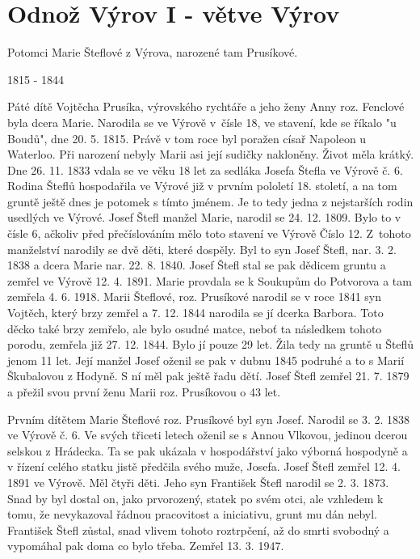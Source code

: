 \documentclass[../dejiny-rodu-prusiku.tex]{subfiles}
\begin{document}
\section{Odnož Výrov I - větve Výrov}

Potomci Marie Šteflové z Výrova, narozené tam Prusíkové.

1815 - 1844

Páté dítě Vojtěcha Prusíka, výrovského rychtáře a jeho ženy Anny roz. Fenclové byla dcera Marie. Narodila se ve Výrově v čísle 18, ve stavení, kde se říkalo "u Boudů", dne 20. 5. 1815. Právě v tom roce byl poražen císař Napoleon u Waterloo. Při narození nebyly Marii asi její sudičky nakloněny. Život měla krátký. Dne 26. 11. 1833 vdala se ve věku 18 let za sedláka Josefa Štefla ve Výrově č. 6. Rodina Šteflů hospodařila ve Výrové již v prvním pololetí 18. století, a na tom gruntě ještě dnes je potomek s tímto jménem. Je to tedy jedna z nejstarších rodin usedlých ve Výrové. Josef Štefl manžel Marie, narodil se 24. 12. 1809. Bylo to v čísle 6, ačkoliv před přečíslováním mělo toto stavení ve Výrově Číslo 12. Z tohoto manželství narodily se dvě děti, které dospěly. Byl to syn Josef Štefl, nar. 3. 2. 1838 a dcera Marie nar. 22. 8. 1840. Josef Štefl stal se pak dědicem gruntu a zemřel ve Výrově 12. 4. 1891. Marie provdala se k Soukupům do Potvorova a tam zemřela 4. 6. 1918. Marii Šteflové, roz. Prusíkové narodil se v roce 1841 syn Vojtěch, který brzy zemřel a 7. 12. 1844 narodila se jí dcerka Barbora. Toto děcko také brzy zemřelo, ale bylo osudné matce, neboť ta následkem tohoto porodu, zemřela již 27. 12. 1844. Bylo jí pouze 29 let. Žila tedy na gruntě u Šteflů jenom 11 let. Její manžel Josef oženil se pak v dubnu 1845 podruhé a to s Marií Škubalovou z Hodyně. S ní měl pak ještě řadu dětí. Josef Štefl zemřel 21. 7. 1879 a přežil svou první ženu Marii roz. Prusíkovou o 43 let.

Prvním dítětem Marie Šteflové roz. Prusíkové byl syn Josef. Narodil se 3. 2. 1838 ve Výrově č. 6. Ve svých třiceti letech oženil se s Annou Vlkovou, jedinou dcerou selskou z Hrádecka. Ta se pak ukázala v hospodářství jako výborná hospodyně a v řízení celého statku jistě předčila svého muže, Josefa. Josef Štefl zemřel 12. 4. 1891 ve Výrově. Měl čtyři děti. Jeho syn František Štefl narodil se 2. 3. 1873. Snad by byl dostal on, jako prvorozený, statek po svém otci, ale vzhledem k tomu, že nevykazoval řád­nou pracovitost a iniciativu, grunt mu dán nebyl. František Štefl zůstal, snad vlivem tohoto roztrpčení, až do smrti svobodný a vypomáhal pak doma co bylo třeba. Zemřel 13. 3. 1947.
\end{document}
